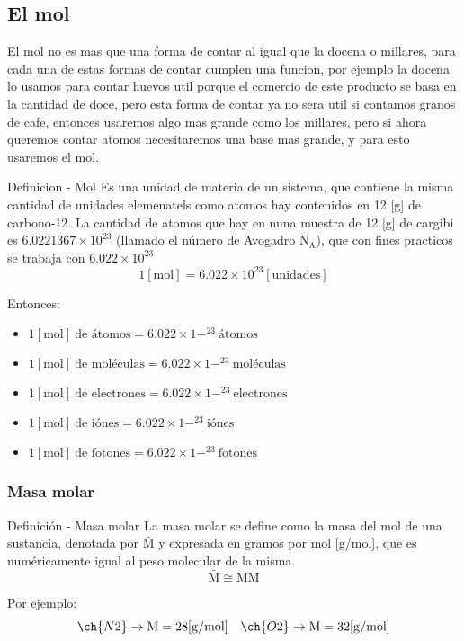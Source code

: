 \subsection*{El mol}
El mol no es mas que una forma de contar al igual que la docena o millares, para cada una de estas formas de contar cumplen una funcion, por ejemplo la docena lo usamos para contar huevos util porque el comercio de este producto se basa en la cantidad de doce, pero esta forma de contar ya no sera util si contamos granos de cafe, entonces usaremos algo mas grande como los millares, pero si ahora queremos contar atomos necesitaremos una base mas grande, y para esto usaremos el mol.
\begin{Theorem*} {Definicion - Mol}
	Es una unidad de materia de un sistema, que contiene la misma cantidad de unidades elemenatels como atomos hay contenidos en 12 [g] de carbono-12. 
	La cantidad de atomos que hay en nuna muestra de 12 [g] de cargibi es $6.0221367\times10^{23}$ (llamado el número de Avogadro $\mathrm{N_A}$), que con fines practicos se trabaja con $6.022\times10^{23}$
	$$ 1\mathrm{[mol]} = 6.022\times10^{23} \mathrm{[unidades]} $$
\end{Theorem*}
Entonces:
\begin{itemize}
	\item $1\mathrm{[mol]} \ \text{de átomos}=6.022\times1-^{23}$$ \ \text{átomos}$
	\item $1\mathrm{[mol]} \ \text{de moléculas}=6.022\times1-^{23}$$ \ \text{moléculas}$
	\item $1\mathrm{[mol]} \ \text{de electrones}=6.022\times1-^{23}$$ \ \text{electrones}$
	\item $1\mathrm{[mol]} \ \text{de iónes}=6.022\times1-^{23}$$ \ \text{iónes}$
	\item $1\mathrm{[mol]} \ \text{de fotones}=6.022\times1-^{23}$$ \ \text{fotones}$
\end{itemize}
\subsubsection*{Masa molar}
\begin{Theorem*} {Definición - Masa molar}
	La masa molar se define como la masa del mol de una sustancia, denotada por $\bar{\mathrm{M}}$ y expresada en gramos por mol [g/mol], que es numéricamente igual al peso molecular de la misma.
	$$ \bar{\mathrm{M}} \cong \mathrm{MM} $$
\end{Theorem*}
Por ejemplo:
$$ \ch{N2} \rightarrow \bar{\mathrm{M}}=28\mathrm{[g/mol]} \quad \ch{O2} \rightarrow \bar{\mathrm{M}}=32\mathrm{[g/mol]} $$
